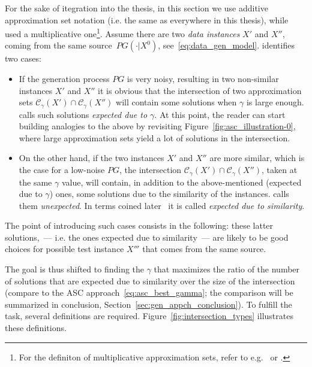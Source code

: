 For the sake of itegration into the thesis, in this section we use additive
approximation set notation (i.e. the same as everywhere in this thesis),
while~\citet{Sramek:PhD} used a multiplicative one\footnote{For the definiton of
multiplicative approximation sets, refer to e.g.~\citep{Sramek:PhD} or
\citep{jcss:2017}.}. Assume there are two \textit{data instances} $X'$ and
$X''$, coming from the same source~$PG(\cdot | X^0)$,
see~\eqref{eq:data_gen_model}. \citet{Sramek:PhD} identifies two cases:

\begin{itemize}
  \item If the generation process $PG$ is very noisy, resulting in two
  non-similar instances $X'$ and $X''$ it is obvious that the intersection of
  two approximation sets ${\mathcal{C}_\gamma}(X')\cap
  {\mathcal{C}_\gamma}(X'')$ will contain some solutions when $\gamma$ is large
  enough. \citet{Sramek:PhD} calls such solutions \emph{expected
  due to $\gamma$}. At this point, the reader can start building analogies to
  the above by revisiting Figure~\ref{fig:asc_illustration-0}, where large
  approximation sets yield a lot of solutions in the intersection.

  \item On the other hand, if the two instances $X'$ and $X''$ are more similar,
  which is the case for a low-noise $PG$, the intersection
  ${\mathcal{C}_\gamma}(X')\cap {\mathcal{C}_\gamma}(X'')$, taken at the same
  $\gamma$ value, will contain, in addition to the above-mentioned (expected due
  to $\gamma$) ones, some solutions due to the similarity of the instances.
  \citet{Sramek:PhD} calls them \emph{unexpected}. In terms coined later~\citep{jcss:2017} 
  it is called \emph{expected due to similarity}.
\end{itemize}

The point of introducing such cases consists in the following: these latter
solutions,~--- i.e. the ones expected due to similarity~--- are likely to be
good choices for possible test instance $X'''$ that comes from the same source.

The goal is thus shifted to finding the $\gamma$ that maximizes the ratio of the
number of solutions that are expected due to similarity over the size of the
intersection (compare to the ASC approach~\eqref{eq:asc_best_gamma}; the
comparison will be summarized in conclusion,
Section~\ref{sec:gen_appch_conclusion}). To fulfill the task, several
definitions are required. Figure~\ref{fig:intersection_types} illustrates these
definitions.

